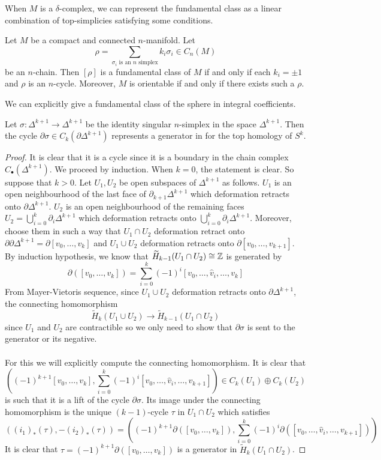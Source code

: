 \documentclass[a4paper]{article}
\begin{document}
When $M$ is a $\delta$-complex, we can represent the fundamental class as a linear combination of top-simplicies satisfying some conditions. 

\begin{prp}{}{} Let $M$ be a compact and connected $n$-manifold. Let $$\rho=\sum_{\sigma_i\text{ is an }n\text{ simplex}}k_i\sigma_i\in C_n(M)$$ be an $n$-chain. Then $[\rho]$ is a fundamental class of $M$ if and only if each $k_i=\pm 1$ and $\rho$ is an $n$-cycle. Moreover, $M$ is orientable if and only if there exists such a $\rho$. 
\end{prp}

We can explicitly give a fundamental class of the sphere in integral coefficients. 

\begin{prp}{}{} Let $\sigma:\Delta^{k+1}\to\Delta^{k+1}$ be the identity singular $n$-simplex in the space $\Delta^{k+1}$. Then the cycle $\partial\sigma\in C_k(\partial\Delta^{k+1})$ represents a generator in for the top homology of $S^k$. \tcbline
\begin{proof}
It is clear that it is a cycle since it is a boundary in the chain complex $C_\bullet(\Delta^{k+1})$. We proceed by induction. When $k=0$, the statement is clear. So suppose that $k>0$. Let $U_1,U_2$ be open subspaces of $\Delta^{k+1}$ as follows. $U_1$ is an open neighbourhood of the last face of $\partial_{k+1}\Delta^{k+1}$ which deformation retracts onto $\partial\Delta^{k+1}$. $U_2$ is an open neighbourhood of the remaining faces $U_2=\bigcup_{i=0}^k\partial_i\Delta^{k+1}$ which deformation retracts onto $\bigcup_{i=0}^k\partial_i\Delta^{k+1}$. Moreover, choose them in such a way that $U_1\cap U_2$ deformation retract onto $\partial\partial\Delta^{k+1}=\partial[v_0,\dots,v_k]$ and $U_1\cup U_2$ deformation retracts onto $\partial[v_0,\dots,v_{k+1}]$. By induction hypothesis, we know that $\widetilde{H}_{k-1}(U_1\cap U_2)\cong\mathbb{Z}$ is generated by $$\partial([v_0,\dots,v_k])=\sum_{i=0}^k(-1)^i[v_0,\dots,\hat{v}_i,\dots,v_k]$$ From Mayer-Vietoris sequence, since $U_1\cup U_2$ deformation retracts onto $\partial\Delta^{k+1}$, the connecting homomorphism $$\widetilde{H}_k(U_1\cup U_2)\to\widetilde{H}_{k-1}(U_1\cap U_2)$$ since $U_1$ and $U_2$ are contractible so we only need to show that $\partial\sigma$ is sent to the generator or its negative. \\~\\

For this we will explicitly compute the connecting homomorphism. It is clear that $$\left((-1)^{k+1}[v_0,\dots,v_k],\sum_{i=0}^k(-1)^i[v_0,\dots,\hat{v}_i,\dots,v_{k+1}]\right)\in C_k(U_1)\oplus C_k(U_2)$$ is such that it is a lift of the cycle $\partial\sigma$. Its image under the connecting homomorphism is the unique $(k-1)$-cycle $\tau$ in $U_1\cap U_2$ which satisfies $$\left((i_1)_\ast(\tau),-(i_2)_\ast(\tau)\right)=\left((-1)^{k+1}\partial([v_0,\dots,v_k]),\sum_{i=0}^k(-1)^i\partial([v_0,\dots,\hat{v}_i,\dots,v_{k+1}])\right)$$ It is clear that $\tau=(-1)^{k+1}\partial([v_0,\dots,v_k])$ is a generator in $\widetilde{H}_k(U_1\cap U_2)$. 
\end{proof}
\end{prp}
\end{document}
